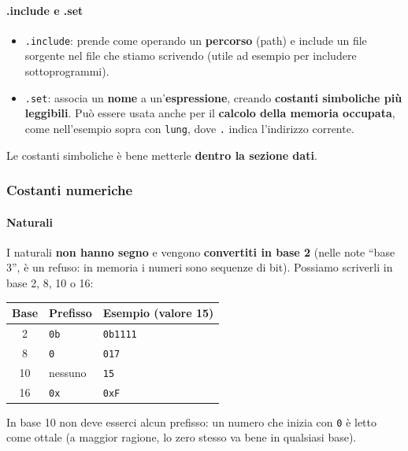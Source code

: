 \documentclass[11pt,a4paper]{article}
\begin{document}
\paragraph*{.include e .set}

\begin{itemize}[leftmargin=*]
  \item \texttt{.include}: prende come operando un \textbf{percorso} (path) e include un file sorgente nel file che stiamo scrivendo (utile ad esempio per includere sottoprogrammi).
  \item \texttt{.set}: associa un \textbf{nome} a un'\textbf{espressione}, creando \textbf{costanti simboliche più leggibili}. Può essere usata anche per il \textbf{calcolo della memoria occupata}, come nell'esempio sopra con \texttt{lung}, dove \texttt{.} indica l'indirizzo corrente.
\end{itemize}

\begin{nota}
Le costanti simboliche è bene metterle \textbf{dentro la sezione dati}.
\end{nota}

\subsubsection*{Costanti numeriche}

\paragraph*{Naturali}

I naturali \textbf{non hanno segno} e vengono \textbf{convertiti in base 2} (nelle note ``base 3'', è un refuso: in memoria i numeri sono sequenze di bit). Possiamo scriverli in base 2, 8, 10 o 16:

\begin{center}
\begin{tabular}{c l l}
\textbf{Base} & \textbf{Prefisso} & \textbf{Esempio (valore 15)} \\ \hline
2  & \texttt{0b} & \texttt{0b1111} \\
8  & \texttt{0}  & \texttt{017} \\
10 & nessuno     & \texttt{15} \\
16 & \texttt{0x} & \texttt{0xF} \\
\end{tabular}
\end{center}

In base 10 non deve esserci alcun prefisso: un numero che inizia con \texttt{0} è letto come ottale (a maggior ragione, lo zero stesso va bene in qualsiasi base).
\end{document}
